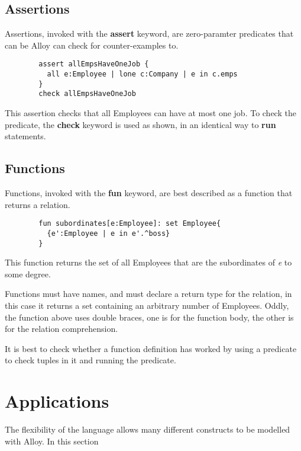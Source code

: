 \documentclass[10pt]{article}
\begin{document}
    \subsection*{Assertions}
      Assertions, invoked with the \textbf{assert} keyword, are zero-paramter predicates that can be Alloy can check for counter-examples to.
      \begin{verbatim}
        assert allEmpsHaveOneJob {
          all e:Employee | lone c:Company | e in c.emps
        }
        check allEmpsHaveOneJob
      \end{verbatim}
      This assertion checks that all Employees can have at most one job. To check the predicate, the \textbf{check} keyword is used as shown, in an identical way to \textbf{run} statements.
    \subsection*{Functions}
      Functions, invoked with the \textbf{fun} keyword, are best described as a function that returns a relation.
      \begin{verbatim}
        fun subordinates[e:Employee]: set Employee{
          {e':Employee | e in e'.^boss}
        }
      \end{verbatim}
      This function returns the set of all Employees that are the subordinates of \textit{e} to some degree.\par
      Functions must have names, and must declare a return type for the relation, in this case it returns a set containing an arbitrary number of Employees. Oddly, the function above uses double braces, one is for the function body, the other is for the relation comprehension.\par
      It is best to check whether a function definition has worked by using a predicate to check tuples in it and running the predicate.

  \section*{Applications}
    The flexibility of the language allows many different constructs to be modelled with Alloy. In this section
\end{document}
